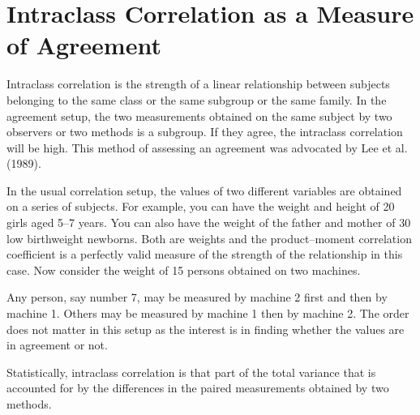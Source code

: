 \section*{Intraclass Correlation as a Measure of Agreement}


Intraclass correlation is the strength of a linear relationship between subjects belonging to the same class or the same subgroup or the same family. In the agreement setup,
the two measurements obtained on the same subject by two observers or two methods is a subgroup. If they agree, the intraclass correlation will be high. This method of
assessing an agreement was advocated by Lee et al. (1989).

In the usual correlation setup, the values of two different variables are obtained on a series of subjects. For example, you can have the weight and height of 20 girls aged 5–7 years. You can also have the weight of the father and mother of 30 low
birthweight newborns. Both are weights and the product–moment correlation coefficient is a perfectly valid measure of the strength of the relationship in this case.
Now consider the weight of 15 persons obtained on two machines. 

Any person, say number 7, may be measured by machine 2 first and then by machine 1. Others may be measured by machine 1 then by machine 2. The order does not matter in this setup as
the interest is in finding whether the values are in agreement or not.

Statistically, intraclass correlation is that part of the total variance that is accounted for by the differences in the paired measurements obtained by two
methods.

